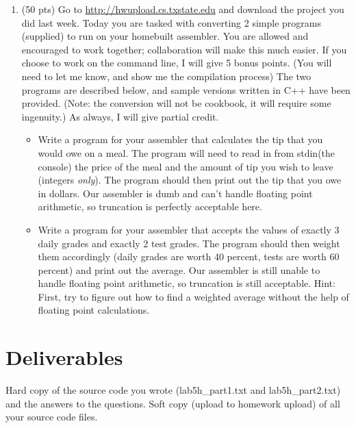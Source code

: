 \documentclass[letterpaper,12pt]{article}
\begin{document}
\begin{enumerate}
\begin{lstlisting}
        }
    \end{lstlisting}
\item (50 pts) Go to \url{http://hwupload.cs.txstate.edu} and download the project you did last week. Today
               you are tasked with converting 2 simple programs (supplied) to run on your homebuilt
               assembler. You are allowed and encouraged to work together; collaboration will make this
               much easier. If you choose to work on the command line, I will give 5 bonus points. (You
               will need to let me know, and show me the compilation process) The two programs are described
               below, and sample versions written in C++ have been provided. (Note: the conversion will
               not be cookbook, it will require some ingenuity.) As always, I will give partial credit.
               \begin{itemize}
                   \item Write a program for your assembler that calculates the tip that you would
                       owe on a meal. The program will need to read in from stdin(the console) the price of the
                       meal and the amount of tip you wish to leave (integers \emph{only}).
                       The program should then print out the tip that you owe in dollars. Our assembler
                       is dumb and can’t handle floating point arithmetic, so truncation is perfectly
                       acceptable here.
                   \item Write a program for your assembler that accepts the values of exactly 3 daily
                         grades and exactly 2 test grades. The program should then weight them accordingly
                         (daily grades are worth 40 percent, tests are worth 60 percent)
                         and print out the average. Our assembler is still unable to handle floating point
                         arithmetic, so truncation is still acceptable. Hint: First, try to figure out how
                         to find a weighted average without the help of floating point calculations.
               \end{itemize}
\end{enumerate}
\section*{Deliverables}
Hard copy of the source code you wrote (lab5h\_part1.txt and lab5h\_part2.txt)
and the answers to the questions. Soft copy (upload to homework upload) of all your source code files.
\end{document}
